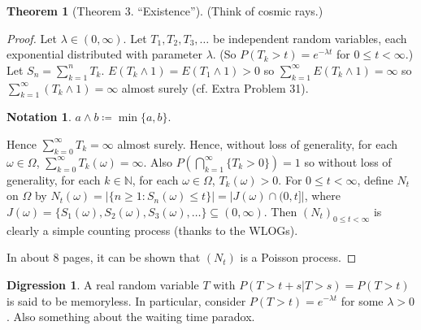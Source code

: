 \documentclass{article}
\newcommand{\N}{\mathbb{N}}
\theoremstyle{definition}
\newtheorem{theorem}{Theorem}
\newtheorem*{notation}{Notation}
\newtheorem*{digression}{Digression}
\begin{document}
\begin{theorem}[Theorem 3. ``Existence'']
    (Think of cosmic rays.)
\end{theorem}
\begin{proof}
    Let $\lambda \in (0, \infty)$. Let $T_1, T_2, T_3, \dots$ be independent random variables, each exponential distributed with parameter $\lambda$. (So $P(T_k > t) = e^{-\lambda t}$ for $0 \leq t < \infty$.) Let $S_n = \sum_{k=1}^n T_k$.
    $E(T_k \wedge 1) = E(T_1 \wedge 1) > 0$ so $\sum_{k=1}^\infty E(T_k \wedge 1) = \infty$ so $\sum_{k=1}^\infty (T_k \wedge 1) = \infty$ almost surely (cf. Extra Problem 31).
    \begin{notation}
    $a \wedge b \coloneqq \min\{a, b\}$.
    \end{notation}
    Hence $\sum_{k=0}^\infty T_k = \infty$ almost surely. Hence, without loss of generality, for each $\omega \in \Omega$, $\sum_{k=0}^\infty T_k(\omega) = \infty$. Also $P\left( \bigcap_{k=1}^\infty \{T_k > 0\} \right) = 1$ so without loss of generality, for each $k \in \N$, for each $\omega \in \Omega$, $T_k(\omega) > 0$. For $0 \leq t < \infty$, define $N_t$ on $\Omega$ by $N_t(\omega) = |\{n \geq 1 : S_n(\omega) \leq t\}| = |J(\omega) \cap (0, t]|$, where $J(\omega) = \{S_1(\omega), S_2(\omega), S_3(\omega), \dots\} \subseteq (0, \infty)$. Then $(N_t)_{0 \leq t < \infty}$ is clearly a simple counting process (thanks to the WLOGs).
    
    In about 8 pages, it can be shown that $(N_t)$ is a Poisson process.
\end{proof}
\begin{digression}
A real random variable $T$ with $P(T > t + s | T > s) = P(T > t)$ is said to be memoryless. In particular, consider $P(T > t) = e^{-\lambda t}$ for some $\lambda > 0$. Also something about the waiting time paradox.
\end{digression}
\end{document}
